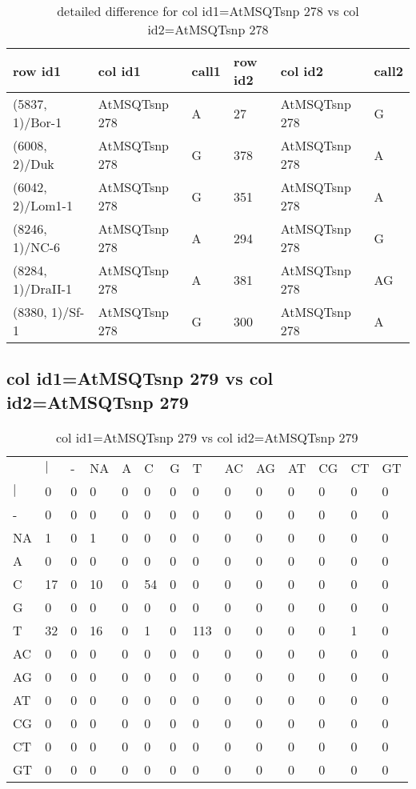 \begin{center}
\begin{longtable}{|l|l|l|l|l|l|}
\caption{detailed difference for col id1=AtMSQTsnp 278 vs col id2=AtMSQTsnp 278} \label{table_dm625}\\
\hline
row id1&col id1&call1&row id2&col id2&call2\\
\hline
(5837, 1)/Bor-1&AtMSQTsnp 278&A&27&AtMSQTsnp 278&G\\
(6008, 2)/Duk&AtMSQTsnp 278&G&378&AtMSQTsnp 278&A\\
(6042, 2)/Lom1-1&AtMSQTsnp 278&G&351&AtMSQTsnp 278&A\\
(8246, 1)/NC-6&AtMSQTsnp 278&A&294&AtMSQTsnp 278&G\\
(8284, 1)/DraII-1&AtMSQTsnp 278&A&381&AtMSQTsnp 278&AG\\
(8380, 1)/Sf-1&AtMSQTsnp 278&G&300&AtMSQTsnp 278&A\\
\hline
\end{longtable}
\end{center}

\subsection{col id1=AtMSQTsnp 279 vs col id2=AtMSQTsnp 279}
\begin{center}
\begin{longtable}{|l|l|l|l|l|l|l|l|l|l|l|l|l|l|}
\caption{col id1=AtMSQTsnp 279 vs col id2=AtMSQTsnp 279} \label{table_dm626}\\
\hline
\\
\hline
&$|$&-&NA&A&C&G&T&AC&AG&AT&CG&CT&GT\\
$|$&0&0&0&0&0&0&0&0&0&0&0&0&0\\
-&0&0&0&0&0&0&0&0&0&0&0&0&0\\
NA&1&0&1&0&0&0&0&0&0&0&0&0&0\\
A&0&0&0&0&0&0&0&0&0&0&0&0&0\\
C&17&0&10&0&54&0&0&0&0&0&0&0&0\\
G&0&0&0&0&0&0&0&0&0&0&0&0&0\\
T&32&0&16&0&1&0&113&0&0&0&0&1&0\\
AC&0&0&0&0&0&0&0&0&0&0&0&0&0\\
AG&0&0&0&0&0&0&0&0&0&0&0&0&0\\
AT&0&0&0&0&0&0&0&0&0&0&0&0&0\\
CG&0&0&0&0&0&0&0&0&0&0&0&0&0\\
CT&0&0&0&0&0&0&0&0&0&0&0&0&0\\
GT&0&0&0&0&0&0&0&0&0&0&0&0&0\\
\hline
\end{longtable}
\end{center}

